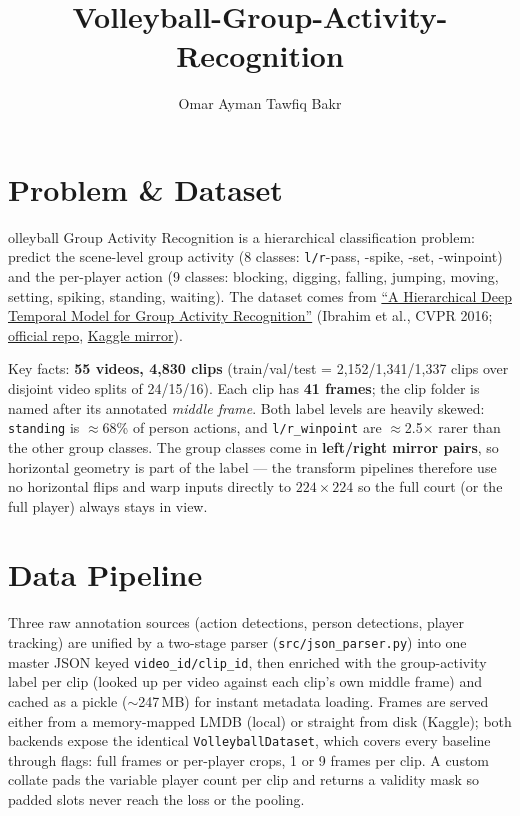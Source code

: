 \documentclass[9pt,a4paper,twocolumn,twoside]{tau-class/tau}
\title{Volleyball-Group-Activity-Recognition}
\author[a,1]{Omar Ayman Tawfiq Bakr \href{bakro0298@gmail.com}{\faGoogle}
 \href{https://www.linkedin.com/in/omarrbakr/}{\faLinkedinIn } \href{https://github.com/omarTBakr}{\faGithub} }
\begin{document}
    \maketitle
    \thispagestyle{firststyle}
    \tauabstract


\section{Problem \& Dataset}

    olleyball Group Activity Recognition is a hierarchical classification problem: predict the scene-level group activity (8 classes: \texttt{l/r}-pass, -spike, -set, -winpoint) and the per-player action (9 classes: blocking, digging, falling, jumping, moving, setting, spiking, standing, waiting). The dataset comes from \href{https://www.cs.sfu.ca/~mori/research/papers/ibrahim-cvpr16.pdf}{``A Hierarchical Deep Temporal Model for Group Activity Recognition''} (Ibrahim et al., CVPR 2016; \href{https://github.com/mostafa-saad/deep-activity-rec}{official repo}, \href{https://www.kaggle.com/datasets/ahmedmohamed365/volleyball}{Kaggle mirror}).

Key facts: \textbf{55 videos, 4{,}830 clips} (train/val/test = 2{,}152/1{,}341/1{,}337 clips over disjoint video splits of 24/15/16). Each clip has \textbf{41 frames}; the clip folder is named after its annotated \emph{middle frame}. Both label levels are heavily skewed: \texttt{standing} is $\approx$68\% of person actions, and \texttt{l/r\_winpoint} are $\approx$2.5$\times$ rarer than the other group classes. The group classes come in \textbf{left/right mirror pairs}, so horizontal geometry is part of the label --- the transform pipelines therefore use no horizontal flips and warp inputs directly to $224 \times 224$ so the full court (or the full player) always stays in view.

\section{Data Pipeline}

Three raw annotation sources (action detections, person detections, player tracking) are unified by a two-stage parser (\texttt{src/json\_parser.py}) into one master JSON keyed \texttt{video\_id/clip\_id}, then enriched with the group-activity label per clip (looked up per video against each clip's own middle frame) and cached as a pickle ($\sim$247\,MB) for instant metadata loading. Frames are served either from a memory-mapped LMDB (local) or straight from disk (Kaggle); both backends expose the identical \texttt{VolleyballDataset}, which covers every baseline through flags: full frames or per-player crops, 1 or 9 frames per clip. A custom collate pads the variable player count per clip and returns a validity mask so padded slots never reach the loss or the pooling.
\end{document}
